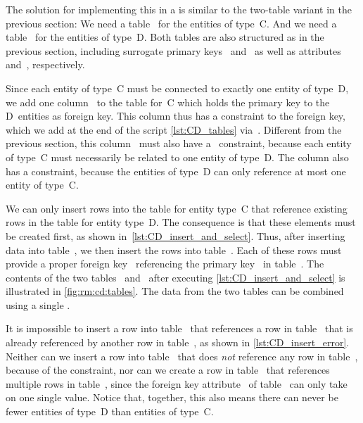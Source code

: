 The solution for implementing this in a  is similar to the two-table variant in the previous section:
We need a table~ for the entities of type~C.
And we need a table~ for the entities of type~D.
Both tables are also structured as in the previous section, including surrogate primary keys~ and~ as well as attributes~ and~, respectively.

Since each entity of type~C must be connected to exactly one entity of type~D, we add one column~ to the table for~C which holds the primary key to the D~entities as foreign key.
This column thus has a  constraint to the foreign key, which we add at the end of the script \cref{lst:CD_tables} via~.
Different from the previous section, this column~ must also have a ~constraint, because each entity of type~C must necessarily be related to one entity of type~D.
The column also has a  constraint, because the entities of type~D can only reference at most one entity of type~C.

We can only insert rows into the table for entity type~C that reference existing rows in the table for entity type~D.
The consequence is that these elements must be created first, as shown in~\cref{lst:CD_insert_and_select}.
Thus, after inserting data into table~, we then insert the rows into table~.
Each of these rows must provide a proper foreign key~ referencing the primary key~ in table~.
The contents of the two tables~ and~ after executing \cref{lst:CD_insert_and_select} is illustrated in \cref{fig:rm:cd:tables}.
The data from the two tables can be combined using a single .

It is impossible to insert a row into table~ that references a row in table~ that is already referenced by another row in table~, as shown in \cref{lst:CD_insert_error}.
Neither can we insert a row into table~ that does \emph{not} reference any row in table~, because of the  constraint, nor can we create a row in table~ that references multiple rows in table~, since the foreign key attribute~ of table~ can only take on one single value.
Notice that, together, this also means there can never be fewer entities of type~D than entities of type~C.%
%
\FloatBarrier%
\endhsection%
%

